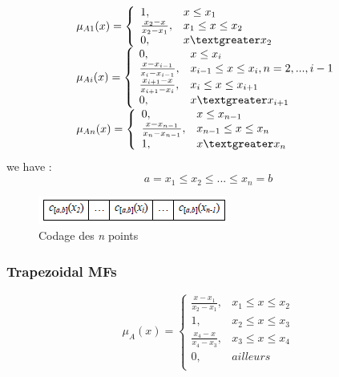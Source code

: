\documentclass[runningheads,a4paper]{llncs}
\begin{document}
\begin{equation} 
\begin{tabular}{l}
$\mu_{A1}(x) =  \left \{
\begin{array}{ll}   %
1,& x \leq x_{1}\\
\frac{x_{2} - x}{x_{2} - x_{1}},& x_{1} \leq x \leq x_{2}\\
0        , &x \textgreater x_{2}
\end{array} 
\right. $	\\
$\mu_{Ai}(x)= \left \{
\begin{array}{ll}
0, &x \leq x_{i}\\
\frac{x - x_{i-1}}{x_{i} - x_{i-1}},& x_{i-1} \leq x \leq x_{i},n=2,...,i-1\\
\frac{x_{i+1} - x}{x_{i+1} - x_{i}}, & x_{i} \leq x \leq x_{i+1}\\
0        , &x \textgreater x_{i+1}
\end{array}
\right.	$	\\		
$\mu_{An}(x)= \left \{
\begin{array}{ll}
0, &x \leq x_{n-1}\\
\frac{x - x_{n-1}}{x_{n} - x_{n-1}},& x_{n-1} \leq x \leq x_{n}\\
1        , &x \textgreater x_{n}\\
\end{array}
\right.$
\end{tabular}
\end{equation}
we have :
\[ \textit{a} = x_{1} \leq x_{2} \leq ...\leq x_{n} = \textit{b} \]
\begin{figure}[!h] 
	\begin{center}
		\includegraphics[scale=0.95]{fig/cotr}
		\caption {Codage des \textit{n} points}
		\label{cotr}
	\end{center}
\end{figure}
\subsubsection{Trapezoidal MFs}

\begin{equation}
\mu_{A}(x)= \left \{
\begin{array}{ll}
\frac{x - x_{1}}{x_{2} - x_{1}},& x_{1} \leq x \leq x_{2}\\
1 , &x_{2} \leq x \leq x_{3}\\
\frac{x_{4} - x}{x_{4} - x_{3}},& x_{3} \leq x \leq x_{4}\\
0        ,& ailleurs\\	
\end{array}
\right.
\end{equation}
																																																																																																																																																																																																																																																																																																																																																												
\end{document}
